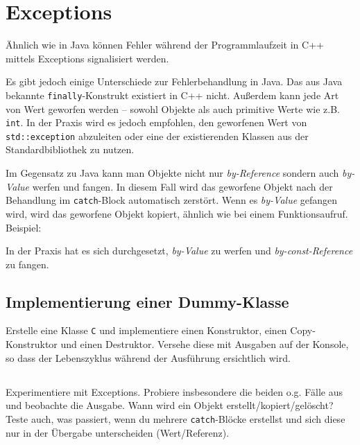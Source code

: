 \section{\ExercisePrefixObjectOrientation Exceptions}
Ähnlich wie in Java können Fehler während der Programmlaufzeit in C++ mittels Exceptions signalisiert werden.



Es gibt jedoch einige Unterschiede zur Fehlerbehandlung in Java.
Das aus Java bekannte \lstinline{finally}-Konstrukt existiert in C++ nicht.
Außerdem kann jede Art von Wert geworfen werden -- sowohl Objekte als auch primitive Werte wie z.B. \lstinline{int}.
In der Praxis wird es jedoch empfohlen, den geworfenen Wert von \lstinline{std::exception} abzuleiten oder eine der existierenden Klassen aus der Standardbibliothek zu nutzen.

Im Gegensatz zu Java kann man Objekte nicht nur \emph{by-Reference} sondern auch \emph{by-Value} werfen und fangen.
In diesem Fall wird das geworfene Objekt nach der Behandlung im \lstinline{catch}-Block automatisch zerstört.
Wenn es \emph{by-Value} gefangen wird, wird das geworfene Objekt kopiert, ähnlich wie bei einem Funktionsaufruf.
Beispiel:



In der Praxis hat es sich durchgesetzt, \emph{by-Value} zu werfen und \emph{by-const-Reference} zu fangen.

\subsection{Implementierung einer Dummy-Klasse}
Erstelle eine Klasse \lstinline{C} und implementiere einen Konstruktor, einen Copy-Konstruktor und einen Destruktor.
Versehe diese mit Ausgaben auf der Konsole, so dass der Lebenszyklus während der Ausführung ersichtlich wird.

\subsection{}
Experimentiere mit Exceptions.
Probiere insbesondere die beiden o.g. Fälle aus und beobachte die Ausgabe.
Wann wird ein Objekt erstellt/kopiert/gelöscht?
Teste auch, was passiert, wenn du mehrere \lstinline{catch}-Blöcke erstellst und sich diese nur in der Übergabe unterscheiden (Wert/Referenz).



